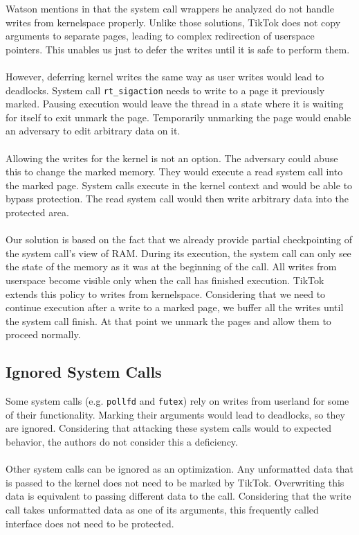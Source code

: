 Watson mentions in \cite{watson2007exploiting} that the system call wrappers he analyzed do not handle writes from kernelspace
properly. Unlike those solutions, TikTok does not copy arguments to separate pages, leading to complex redirection 
of userspace pointers. This unables us just to defer the writes until it is safe to perform them.
\\
\\
However, deferring kernel writes the same way as user writes would lead to deadlocks. System call \texttt{rt\_sigaction}
needs to write to a page it previously marked. Pausing execution would leave the thread in a state where it is waiting for itself
to exit unmark the page. Temporarily unmarking the page would enable an adversary to edit arbitrary data on it.
\\
\\
Allowing the writes for the kernel is not an option. The adversary could abuse this to change the marked memory. 
They would execute a read system call into the marked page. System calls execute in the kernel context and would 
be able to bypass protection. The read system call would then write arbitrary data into the protected area.
\\
\\
Our solution is based on the fact that we already provide partial checkpointing of the system call's view of RAM.
During its execution, the system call can only see the state of the memory as it was at the beginning of the call.
All writes from userspace become visible only when the call has finished execution. TikTok extends this policy to 
writes from kernelspace. Considering that we need to continue execution after a write to a marked page, we buffer 
all the writes until the system call finish. At that point we unmark the pages and allow them to proceed normally.

\subsection{Ignored System Calls}
\label{subsec:ignoredcalls}

Some system calls (e.g. \texttt{pollfd} and \texttt{futex}) rely on writes from userland for some of their functionality. Marking their arguments
would lead to deadlocks, so they are ignored. Considering that attacking these system calls would to expected behavior, the authors
do not consider this a deficiency.
\\
\\
Other system calls can be ignored as an optimization. Any unformatted data that is passed to the kernel does not need
to be marked by TikTok. Overwriting this data is equivalent to passing different data to the call. Considering
that the write call takes unformatted data as one of its arguments, this frequently called interface does not need to
be protected.

